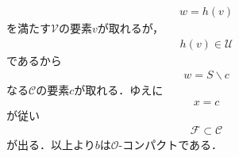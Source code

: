 \begin{sketch}
\begin{description}
\begin{align}
					w = h(v)
				\end{align}
				を満たす$\mathscr{V}$の要素$v$が取れるが，
				\begin{align}
					h(v) \in \mathscr{U}
				\end{align}
				であるから
				\begin{align}
					w = S \backslash c
				\end{align}
				なる$\mathscr{C}$の要素$c$が取れる．ゆえに
				\begin{align}
					x = c
				\end{align}
				が従い
				\begin{align}
					\mathscr{F} \subset \mathscr{C}
				\end{align}
				が出る．以上より$b$は$\mathscr{O}$-コンパクトである．
				\QED
		\end{description}
	\end{sketch}